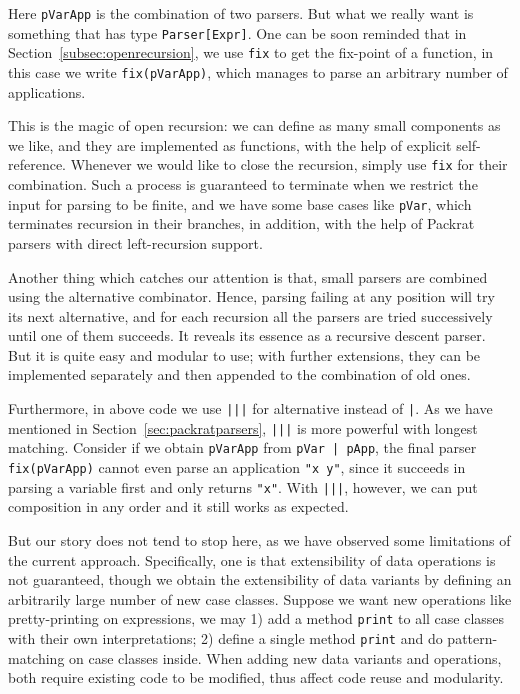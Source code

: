 
Here \lstinline{pVarApp} is the combination of two parsers. But what we really want is something that has type \lstinline{Parser[Expr]}. One can be soon reminded that in Section~\ref{subsec:openrecursion}, we use \lstinline{fix} to get the fix-point of a function, in this case we write \lstinline{fix(pVarApp)}, which manages to parse an arbitrary number of applications.

This is the magic of open recursion: we can define as many small components as we like, and they are implemented as functions, with the help of explicit self-reference. Whenever we would like to close the recursion, simply use \lstinline{fix} for their combination. Such a process is guaranteed to terminate when we restrict the input for parsing to be finite, and we have some base cases like \lstinline{pVar}, which terminates recursion in their branches, in addition, with the help of Packrat parsers with direct left-recursion support.

Another thing which catches our attention is that, small parsers are combined using the alternative combinator. Hence, parsing failing at any position will try its next alternative, and for each recursion all the parsers are tried successively until one of them succeeds. It reveals its essence as a recursive descent parser. But it is quite easy and modular to use; with further extensions, they can be implemented separately and then appended to the combination of old ones.

Furthermore, in above code we use \lstinline{|||} for alternative instead of \lstinline{|}. As we have mentioned in Section~\ref{sec:packratparsers}, \lstinline{|||} is more powerful with longest matching. Consider if we obtain \lstinline{pVarApp} from \lstinline{pVar | pApp}, the final parser \lstinline{fix(pVarApp)} cannot even parse an application \lstinline{"x y"}, since it succeeds in parsing a variable first and only returns \lstinline{"x"}. With \lstinline{|||}, however, we can put composition in any order and it still works as expected.

But our story does not tend to stop here, as we have observed some limitations of the current approach. Specifically, one is that extensibility of data operations is not guaranteed, though we obtain the extensibility of data variants by defining an arbitrarily large number of new case classes. Suppose we want new operations like pretty-printing on expressions, we may 1) add a method \lstinline{print} to all case classes with their own interpretations; 2) define a single method \lstinline{print} and do pattern-matching on case classes inside. When adding new data variants and operations, both require existing code to be modified, thus affect code reuse and modularity.

